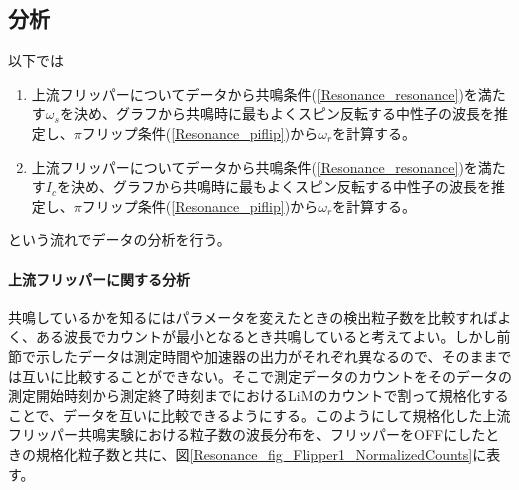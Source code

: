 \clearpage
\subsection{分析}
以下では
\begin{enumerate}
\item 上流フリッパーについてデータから共鳴条件(\ref{Resonance_resonance})を満たす$\omega_s$を決め、グラフから共鳴時に最もよくスピン反転する中性子の波長を推定し、$\pi$フリップ条件(\ref{Resonance_piflip})から$\omega_r$を計算する。
\item 上流フリッパーについてデータから共鳴条件(\ref{Resonance_resonance})を満たす$I_c$を決め、グラフから共鳴時に最もよくスピン反転する中性子の波長を推定し、$\pi$フリップ条件(\ref{Resonance_piflip})から$\omega_r$を計算する。
\end{enumerate}
という流れでデータの分析を行う。

\paragraph{上流フリッパーに関する分析}
共鳴しているかを知るにはパラメータを変えたときの検出粒子数を比較すればよく、ある波長でカウントが最小となるとき共鳴していると考えてよい。しかし前節で示したデータは測定時間や加速器の出力がそれぞれ異なるので、そのままでは互いに比較することができない。そこで測定データのカウントをそのデータの測定開始時刻から測定終了時刻までにおけるLiMのカウントで割って規格化することで、データを互いに比較できるようにする。このようにして規格化した上流フリッパー共鳴実験における粒子数の波長分布を、フリッパーをOFFにしたときの規格化粒子数と共に、図\ref{Resonance_fig_Flipper1_NormalizedCounts}に表す。

